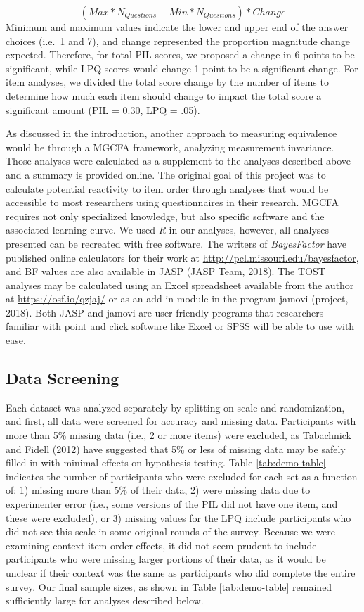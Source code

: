 \documentclass[english,man, mask]{apa6}
\theoremstyle{definition}
\theoremstyle{definition}
\theoremstyle{definition}
\theoremstyle{remark}
\begin{document}
\[
(Max*N_{Questions} - Min*N_{Questions}) * Change
\] Minimum and maximum values indicate the lower and upper end of the
answer choices (i.e.~1 and 7), and change represented the proportion
magnitude change expected. Therefore, for total PIL scores, we proposed
a change in 6 points to be significant, while LPQ scores would change 1
point to be a significant change. For item analyses, we divided the
total score change by the number of items to determine how much each
item should change to impact the total score a significant amount (PIL =
0.30, LPQ = .05).

As discussed in the introduction, another approach to measuring
equivalence would be through a MGCFA framework, analyzing measurement
invariance. Those analyses were calculated as a supplement to the
analyses described above and a summary is provided online. The original
goal of this project was to calculate potential reactivity to item order
through analyses that would be accessible to most researchers using
questionnaires in their research. MGCFA requires not only specialized
knowledge, but also specific software and the associated learning curve.
We used \emph{R} in our analyses, however, all analyses presented can be
recreated with free software. The writers of \emph{BayesFactor} have
published online calculators for their work at
\url{http://pcl.missouri.edu/bayesfactor}, and BF values are also
available in JASP (JASP Team, 2018). The TOST analyses may be calculated
using an Excel spreadsheet available from the author at
\url{https://osf.io/qzjaj/} or as an add-in module in the program jamovi
(project, 2018). Both JASP and jamovi are user friendly programs that
researchers familiar with point and click software like Excel or SPSS
will be able to use with ease.

\subsection{Data Screening}\label{data-screening}

Each dataset was analyzed separately by splitting on scale and
randomization, and first, all data were screened for accuracy and
missing data. Participants with more than 5\% missing data (i.e., 2 or
more items) were excluded, as Tabachnick and Fidell (2012) have
suggested that 5\% or less of missing data may be safely filled in with
minimal effects on hypothesis testing. Table \ref{tab:demo-table}
indicates the number of participants who were excluded for each set as a
function of: 1) missing more than 5\% of their data, 2) were missing
data due to experimenter error (i.e., some versions of the PIL did not
have one item, and these were excluded), or 3) missing values for the
LPQ include participants who did not see this scale in some original
rounds of the survey. Because we were examining context item-order
effects, it did not seem prudent to include participants who were
missing larger portions of their data, as it would be unclear if their
context was the same as participants who did complete the entire survey.
Our final sample sizes, as shown in Table \ref{tab:demo-table} remained
sufficiently large for analyses described below.
\end{document}
